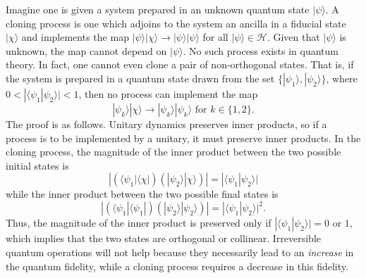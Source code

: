 \documentclass[pra,superscriptaddress,nofootinbib,12pt]{revtex4-2}
\def\be{\begin{equation}}
\def\ee{\end{equation}}
\begin{document}
Imagine one is given a system prepared in an unknown quantum state $|\psi\rangle$.  A cloning process is one which adjoins to the system an ancilla in a fiducial state $|\chi\rangle$ and implements the map $|\psi\rangle |\chi\rangle \to |\psi\rangle |\psi\rangle $ for all $|\psi\rangle \in \mathcal{H}$.  Given that $|\psi\rangle$ is unknown, the map cannot depend on $|\psi\rangle$.  No such process exists in quantum theory\cite{NoCloning}.  In fact, one cannot even clone a pair of non-orthogonal states.  That is, if the system is prepared in a quantum state drawn from the set $\{ |\psi_1\rangle,|\psi_2\rangle \}$, where $0< |\langle \psi_1|\psi_2 \rangle| < 1$, then no process can implement the map
\be
|\psi_k\rangle |\chi\rangle \to |\psi_k\rangle |\psi_k\rangle \textrm{ for } k\in\{1,2\}.
\ee
The proof is as follows.  Unitary dynamics preserves inner products, so if a process is to be implemented by a unitary, it must preserve inner products.  In the cloning process, the magnitude of the inner product between the two possible initial states is
\be
|(\langle \psi_1 |\langle \chi|)(|\psi_2\rangle |\chi\rangle)|=|\langle \psi_1 |\psi_2\rangle|
\ee
while the inner product between the two possible final states is
\be
|(\langle \psi_1 |\langle \psi_1|)(|\psi_2\rangle |\psi_2\rangle)|=|\langle \psi_1 |\psi_2\rangle|^2.
\ee
Thus, the magnitude of the inner product is preserved only if $|\langle \psi_1 |\psi_2\rangle|=0$ or $1$, which implies that the two states are orthogonal or collinear.  Irreversible quantum operations will not help because they necessarily lead to an \emph{increase} in the quantum fidelity, while a cloning process requires a decrease in this fidelity.
\end{document}
